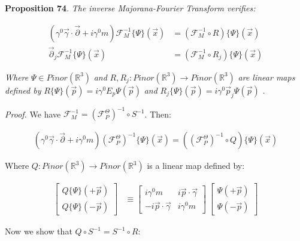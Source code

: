 \documentclass[11pt]{book}
\begin{document}
\textbf{Proposition 74}. \emph{The inverse Majorana-Fourier Transform
verifies: }

\begin{equation}\begin{aligned}
(\gamma^0\vec{\gamma}\cdot \vec{\partial}+i\gamma^0
m)\mathcal{F}_M^{-1}\{\Psi\}(\vec{x})&=(\mathcal{F}_M^{-1}\circ
R)\{\Psi\}(\vec{x})\\
\vec{\partial}_j\mathcal{F}_M^{-1}\{\Psi\}(\vec{x})&=(\mathcal{F}_M^{-1}\circ
R_j)\{\Psi\}(\vec{x})\end{aligned}\end{equation}

\emph{ Where }\(\Psi\in Pinor(\mathbb{R}^3)\)\emph{ and
}\(R,R_j:Pinor(\mathbb{R}^3)\to Pinor(\mathbb{R}^3)\)\emph{ are linear
maps defined by }\(R\{\Psi\}(\vec{p})=i\gamma^0
 E_p\Psi(\vec{p})\)\emph{ and
}\(R_j\{\Psi\}(\vec{p})=i\gamma^0 \vec{p}_j\Psi(\vec{p})\)\emph{ .}

\emph{Proof.} We have
\(\mathcal{F}^{-1}_{M}=(\mathcal{F}^{\Theta}_{P})^{-1}\circ S^{-1}\).
Then:

\begin{equation}\begin{aligned}
(\gamma^0\vec{\gamma}\cdot \vec{\partial}+i\gamma^0
m)(\mathcal{F}^\Theta_P)^{-1}\{\Psi\}(\vec{x})=((\mathcal{F}^\Theta_P)^{-1}\circ Q) \{\Psi\}(\vec{x})\end{aligned}\end{equation}

Where \(Q:Pinor(\mathbb{R}^3)\to Pinor(\mathbb{R}^3)\) is a linear map
defined by:

\begin{equation}\begin{aligned}
\left[ \begin{array}{l}
Q\{\Psi\}(+\vec{p})\\
Q\{\Psi\}(-\vec{p})
\end{array}
\right]&\equiv
\left[ \begin{array}{cc}
i\gamma^0 m 
& i\vec{p}\cdot \vec{\gamma}\\
-i\vec{p}\cdot \vec{\gamma}
& i\gamma^0 m
\end{array}
\right]\ 
\left[ \begin{array}{l}
\Psi(+\vec{p})\\
\Psi(-\vec{p})
\end{array}
\right]\end{aligned}\end{equation}

Now we show that \(Q\circ S^{-1}=S^{-1}\circ R\):
\end{document}
